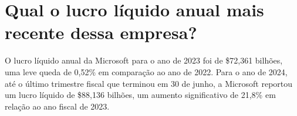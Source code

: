 \section{Qual o lucro líquido anual mais recente dessa empresa?}

O lucro líquido anual da Microsoft para o ano de 2023 foi de \$72,361 bilhões, uma leve queda de 0,52\% em comparação ao ano de 2022. Para o ano de 2024, até o último trimestre fiscal que terminou em 30 de junho, a Microsoft reportou um lucro líquido de \$88,136 bilhões, um aumento significativo de 21,8\% em relação ao ano fiscal de 2023.
